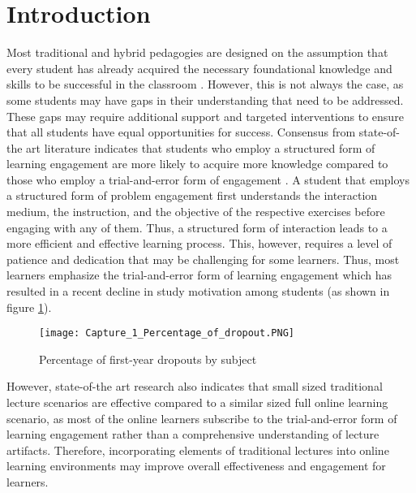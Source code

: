 \documentclass[conference]{IEEEtran}
\begin{document}
\IEEEpeerreviewmaketitle



\section{Introduction}
Most traditional and hybrid pedagogies are designed on the assumption that every student has already acquired the necessary foundational knowledge and skills to be successful in the classroom \cite{scida2006hybrid}. However, this is not always the case, as some students may have gaps in their understanding that need to be addressed. These gaps may require additional support and targeted interventions to ensure that all students have equal opportunities for success. Consensus from state-of-the art literature indicates that students who employ a structured form of learning engagement are more likely to acquire more knowledge compared to those who employ a trial-and-error form of engagement \cite{davies2002student,damcsa2016student}. A student that employs a structured form of problem engagement first understands the interaction medium, the instruction, and the objective of the respective exercises before engaging with any of them. Thus, a structured form of interaction leads to  a more efficient and effective learning process. This, however, requires a level of patience and dedication that may be challenging for some learners. Thus, most learners emphasize the trial-and-error form of learning engagement  which has resulted in a recent decline in study motivation among students (as shown in figure \ref{Courant_2}). 

\begin{figure}[ht!] %
\centering
\texttt{[image: Capture\_1\_Percentage\_of\_dropout.PNG]}
\caption{Percentage of first-year dropouts by subject \cite{hesa}}
\label{Courant_2}
\end{figure}
 

However, state-of-the art research also indicates that small sized traditional lecture scenarios are effective compared to a similar sized full online learning scenario, as most of the online learners subscribe to the trial-and-error form of learning engagement rather than a comprehensive understanding of lecture artifacts. Therefore, incorporating elements of traditional lectures into online learning environments may improve overall effectiveness and engagement for learners.\\
\end{document}
